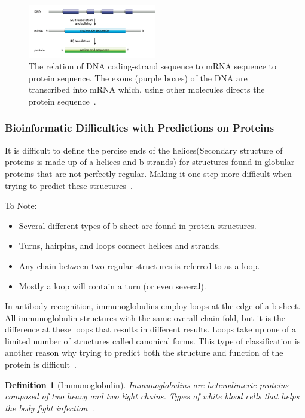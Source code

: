 \documentclass{report}
\newtheorem{definition}{Definition}[section]
\begin{document}
\begin{figure}[H]
    \centering
    \includegraphics[width=0.5\textwidth]{Transcription and translation.png}
    \caption{\label{fig:Transcription and translation}The relation of DNA coding-strand sequence to mRNA sequence to protein sequence. The exons (purple boxes) of the DNA are transcribed into mRNA which, using other molecules directs the protein sequence~\cite{zvelebil_understanding_2008}.}
\end{figure}

\subsubsection{Bioinformatic Difficulties with Predictions on Proteins}

It is difficult to define the percise ends of the helices(Secondary structure of proteins is made up of a-helices and b-strands) for structures found in globular proteins that are not perfectly regular. Making it one step more difficult when trying to predict these structures~\cite{zvelebil_understanding_2008}.

To Note:
\begin{itemize}
    \item Several different types of b-sheet are found in protein structures.
    \item Turns, hairpins, and loops connect helices and strands. 
    \item Any chain between two regular structures is referred to as a loop.
    \item Mostly a loop will contain a turn (or even several).
\end{itemize} 

In antibody recognition, immunoglobulins employ loops at the edge of a b-sheet. All immunoglobulin structures with the same overall chain fold, but it is the difference at these loops that results in different results. Loops take up one of a limited number of structures called canonical forms. This type of classification is another reason why trying to predict both the structure and function of the protein is difficult~\cite{zvelebil_understanding_2008}.

\begin{definition}[Immunoglobulin]
    Immunoglobulins are heterodimeric proteins composed of two heavy and two light chains. Types of white blood cells that helps the body fight infection~\cite{schroeder_structure_2010}.
\end{definition}
\end{document}
